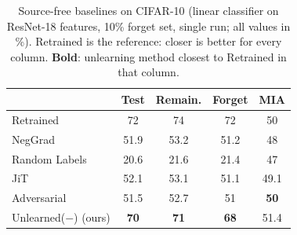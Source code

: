\begin{table}[t]
\centering\small
\setlength{\tabcolsep}{4pt}
\begin{tabular}{@{}lcccc@{}}
\toprule
& Test & Remain. & Forget & MIA \\
\midrule
Retrained & 72 & 74 & 72 & 50 \\
\midrule
NegGrad & 51.9 & 53.2 & 51.2 & 48 \\
Random Labels & 20.6 & 21.6 & 21.4 & 47 \\
JiT & 52.1 & 53.1 & 51.1 & 49.1 \\
Adversarial & 51.5 & 52.7 & 51 & \textbf{50} \\
Unlearned($-$) (ours) & \textbf{70} & \textbf{71} & \textbf{68} & 51.4 \\
\bottomrule
\end{tabular}
\caption{Source-free baselines on CIFAR-10 (linear classifier on ResNet-18 features, 10\% forget set, single run; all values in \%). Retrained is the reference: closer is better for every column. \textbf{Bold}: unlearning method closest to Retrained in that column.}
\label{tab:baselines}
\end{table}
